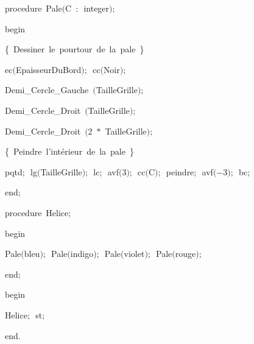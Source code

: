 {\pagebreak[3] 
\vspace{\neglskip}\mbox{\blc  \blk\idt  \mcl procedure\idt \ Pale$($C\ $:$\ integer$)$$;$}\par 
\vspace{\neglskip}\mbox{\blc  \blk\idt  \mcl begin\idt }\par 
\vspace{\neglskip}\mbox{\blc  \blk\blk\idt  \cmt  \{\ Dessiner\ le\ pourtour\ de\ la\ pale\ \}\idt }\par 
\vspace{\neglskip}\mbox{\blc  \blk\blk\idt  ec$($EpaisseurDuBord$)$$;$\ cc$($Noir$)$$;$\ }\par 
\vspace{\neglskip}\mbox{\blc  \blk\blk\idt  Demi\_Cercle\_Gauche\ $($TailleGrille$)$$;$\ }\par 
\vspace{\neglskip}\mbox{\blc  \blk\blk\idt  Demi\_Cercle\_Droit\ $($TailleGrille$)$$;$\ }\par 
\vspace{\neglskip}\mbox{\blc  \blk\blk\idt  Demi\_Cercle\_Droit\ $($2\ $\ast$\ TailleGrille$)$$;$}\par 
\vspace{\neglskip}\mbox{\blc  \blk\blk\idt  \cmt  \{\ Peindre\ l{'}intérieur\ de\ la\ pale\ \}\idt }\par 
\vspace{\neglskip}\mbox{\blc  \blk\blk\idt  pqtd$;$\ lg$($TailleGrille$)$$;$\ lc$;$\ avf$($3$)$$;$\ cc$($C$)$$;$\ peindre$;$\ avf$($$-$3$)$$;$\ bc$;$\ }\par 
\vspace{\neglskip}\mbox{\blc  \blk\idt  \mcl end\idt $;$}\par 
\medskip

\pagebreak[3] 
\vspace{\neglskip}\mbox{\blc  \blk\idt  \mcl procedure\idt \ Helice$;$}\par 
\vspace{\neglskip}\mbox{\blc  \blk\idt  \mcl begin\idt }\par 
\vspace{\neglskip}\mbox{\blc  \blk\blk\idt  Pale$($bleu$)$$;$\ Pale$($indigo$)$$;$\ Pale$($violet$)$$;$\ Pale$($rouge$)$$;$\ }\par 
\vspace{\neglskip}\mbox{\blc  \blk\idt  \mcl end\idt $;$}\par 
\medskip

\vspace{\neglskip}\mbox{\blc  \idt  \mcl begin\idt }\par 
\vspace{\neglskip}\mbox{\blc  \blk\idt  Helice$;$\ st$;$}\par 
\vspace{\neglskip}\mbox{\blc  \idt  \mcl end\idt $.$}\par 

\medskip }

